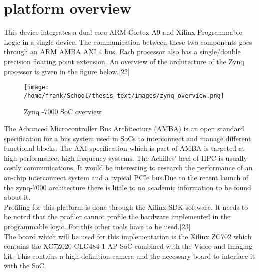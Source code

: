 


\chapter{platform overview}

This device integrates a dual core ARM Cortex-A9 and Xilinx Programmable Logic in a single device. The communication between these two components goes through an ARM AMBA AXI 4 bus. Each processor also has a single/double precision floating point extension. An overview of the architecture of the Zynq processor is given in the figure below.[22]

\begin{figure}[H]
\centering
\texttt{[image: /home/frank/School/thesis\_text/images/zynq\_overview.png]}
\caption{Zynq -7000 SoC overview}
\label{img:zynq_overview}
\end{figure}


The Advanced Microcontroller Bus Architecture (AMBA) is an open standard specification for a bus system used in SoCs to interconnect and manage different functional blocks. The AXI specification which is part of AMBA is targeted at high performance, high frequency systems. The Achilles' heel of HPC is usually costly communications. It would be interesting to research the performance of an on-chip interconnect system and a typical PCIe bus.Due to the recent launch of the zynq-7000 architecture there is little to no academic information to be found about it.\\
Profiling for this platform is done through the Xilinx SDK software. It needs to be noted that the profiler cannot profile the hardware implemented in the programmable logic. For this other tools have to be used.[23]\\
The board which will be used for this implementation is the Xilinx ZC702 which contains the XC7Z020 CLG484-1 AP SoC combined with the Video and Imaging kit. This contains a high definition camera and the necessary board to interface it with the SoC.

